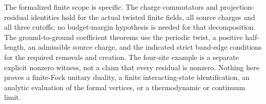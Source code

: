 The formalized finite scope is specific.  The charge commutators and
projection-residual identities hold for the actual twisted finite fields,
all source charges and all three cutoffs; no budget-margin hypothesis is
needed for that decomposition.  The ground-to-ground coefficient theorems
use the periodic twist, a positive half-length, an admissible source charge,
and the indicated strict band-edge conditions for the required removals and
creation.  The four-site example is a separate explicit nonzero witness,
not a claim that every residual is nonzero.  Nothing here proves a finite-Fock
unitary duality, a finite interacting-state identification, an analytic
evaluation of the formal vertices, or a thermodynamic or continuum limit.
